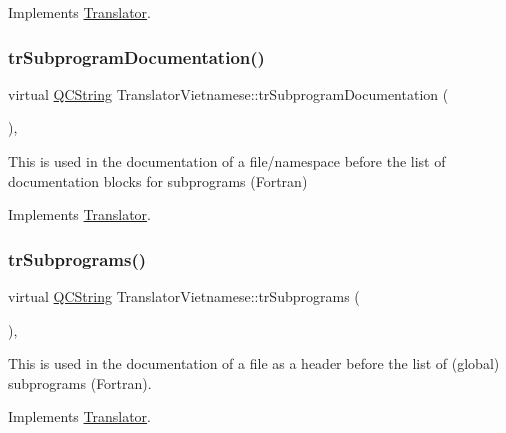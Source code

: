 Implements \mbox{\hyperlink{class_translator}{Translator}}.

\mbox{\label{class_translator_vietnamese_a2ef068d4f6f6f325d9785930bc769a08}} 
\subsubsection{\texorpdfstring{trSubprogramDocumentation()}{trSubprogramDocumentation()}}
{\footnotesize\ttfamily virtual \mbox{\hyperlink{class_q_c_string}{Q\+C\+String}} Translator\+Vietnamese\+::tr\+Subprogram\+Documentation (\begin{DoxyParamCaption}{ }\end{DoxyParamCaption})\hspace{0.3cm}{\ttfamily [inline]}, {\ttfamily [virtual]}}

This is used in the documentation of a file/namespace before the list of documentation blocks for subprograms (Fortran) 

Implements \mbox{\hyperlink{class_translator}{Translator}}.

\mbox{\label{class_translator_vietnamese_af124cb86e1c74879bb78188ed0deabb2}} 
\subsubsection{\texorpdfstring{trSubprograms()}{trSubprograms()}}
{\footnotesize\ttfamily virtual \mbox{\hyperlink{class_q_c_string}{Q\+C\+String}} Translator\+Vietnamese\+::tr\+Subprograms (\begin{DoxyParamCaption}{ }\end{DoxyParamCaption})\hspace{0.3cm}{\ttfamily [inline]}, {\ttfamily [virtual]}}

This is used in the documentation of a file as a header before the list of (global) subprograms (Fortran). 

Implements \mbox{\hyperlink{class_translator}{Translator}}.

\mbox{\label{class_translator_vietnamese_a70b98567b7ba46fe0965a356905e3da1}} 
